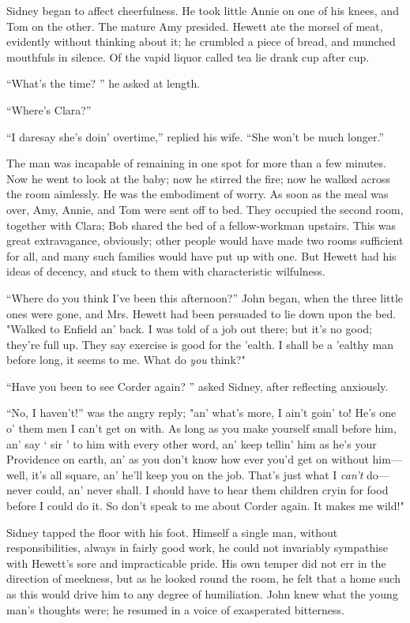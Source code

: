 Sidney began to affect cheerfulness. He took little Annie on one of his
knees, and Tom on the other. The mature Amy presided. Hewett ate the
morsel of meat, evidently without thinking about it; he crumbled a piece
of bread, and munched mouthfuls in
{\protect\hypertarget{50}{}{}}silence. Of the vapid liquor called tea
lie drank cup after cup.

``What's the time? '' he asked at length.

``Where's Clara?''

``I daresay she's doin' overtime,'' replied his wife. ``She won't be
much longer.''

The man was incapable of remaining in one spot for more than a few
minutes. Now he went to look at the baby; now he stirred the fire; now
he walked across the room aimlessly. He was the embodiment of worry. As
soon as the meal was over, Amy, Annie, and Tom were sent off to bed.
They occupied the second room, together with Clara; Bob shared the bed
of a fellow-workman upstairs. This was great extravagance, obviously;
other people would have made two rooms sufficient for all, and many such
families would have put up with one. But Hewett had his ideas of
decency, and stuck to them with characteristic wilfulness.

``Where do you think I've been this afternoon?'' John began, when the
three little ones were gone, and Mrs. Hewett had
{\protect\hypertarget{51}{}{}}been persuaded to lie down upon the bed.
"Walked to Enfield an' back. I was told of a job out there; but it's no
good; they're full up. They say exercise is good for the 'ealth. I shall
be a 'ealthy man before long, it seems to me. What do \emph{you} think?"

``Have you been to see Corder again? '' asked Sidney, after reflecting
anxiously.

``No, I haven't!'' was the angry reply; "an' what's more, I ain't goin'
to! He's one o' them men I can't get on with. As long as you make
yourself small before him, an' say ` sir ' to him with every other word,
an' keep tellin' him as he's your Providence on earth, an' as you don't
know how ever you'd get on without him---well, it's all square, an'
he'll keep you on the job. That's just what I \emph{can't} do---never
could, an' never shall. I should have to hear them children cryin for
food before I could do it. So don't speak to me about Corder again. It
makes me wild!"

Sidney tapped the floor with his foot. Himself a single man, without
responsibilities, always in fairly good work, he could not
{\protect\hypertarget{52}{}{}}invariably sympathise with Hewett's sore
and impracticable pride. His own temper did not err in the direction of
meekness, but as he looked round the room, he felt that a home such as
this would drive him to any degree of humiliation. John knew what the
young man's thoughts were; he resumed in a voice of exasperated
bitterness.


